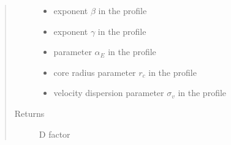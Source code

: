 \documentclass[letterpaper,10pt,english]{sphinxmanual}
\begin{document}
\begin{fulllineitems}
\begin{quote}
\begin{description}
\begin{itemize}
\item {} 
\sphinxAtStartPar
{} \textendash{} exponent \(\beta\) in the {\hyperref[\detokenize{diffsph.profiles:diffsph.profiles.templates.hdz}]{}} profile

\item {} 
\sphinxAtStartPar
{} \textendash{} exponent \(\gamma\) in the {\hyperref[\detokenize{diffsph.profiles:diffsph.profiles.templates.hdz}]{}} profile

\item {} 
\sphinxAtStartPar
{} \textendash{} parameter \(\alpha_E\) in the {\hyperref[\detokenize{diffsph.profiles:diffsph.profiles.templates.enst}]{}} profile

\item {} 
\sphinxAtStartPar
{} \textendash{} core radius parameter \(r_c\) in the {\hyperref[\detokenize{diffsph.profiles:diffsph.profiles.templates.cnfw}]{}} profile

\item {} 
\sphinxAtStartPar
{} \textendash{} velocity dispersion parameter \(\sigma_v\) in the {\hyperref[\detokenize{diffsph.profiles:diffsph.profiles.templates.sis}]{}} profile

\end{itemize}

\item[{Returns}] \leavevmode
\sphinxAtStartPar
D factor

\end{description}\end{quote}

\end{fulllineitems}

\end{document}
